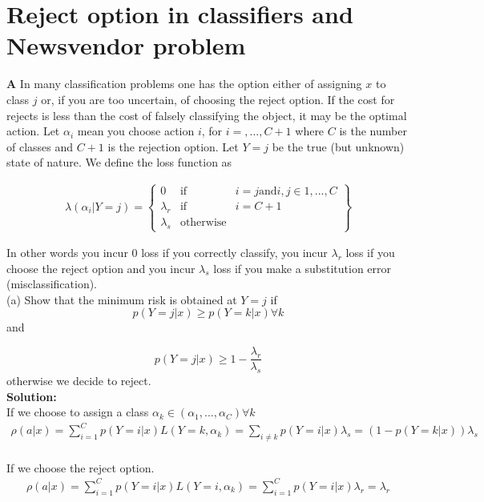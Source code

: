 \documentclass{article}
\begin{document}
\newpage
\section{Reject option in classifiers and Newsvendor problem}
\textbf{A} In many classification problems one has the option either of assigning $x$ to class $j$ or, if you are too uncertain, of choosing the reject option. If the cost for rejects is less than the cost of falsely classifying the object, it may be the optimal action. Let $\alpha_{i}$ mean you choose action $i$, for $i=,...,C+1$ where  $C$ is the number of classes and $C+1$ is the rejection option. Let $Y = j$ be the true (but unknown) state of nature. We define the loss function as 

\begin{equation}
\begin{aligned}
     \lambda(\alpha_{i}|Y=j) =  \left\{\begin{array}{rcl}
         0 & \mbox{if} & i=j \mbox{and} i,j \in {1,...,C} \\ 
         \lambda_{r}  & \mbox{if} & i=C+1 \\
         \lambda_{s}  & \mbox{otherwise}
         \end{array} \right\}
\end{aligned}
\end{equation}

In other words you incur 0 loss if you correctly classify, you incur $\lambda_{r}$ loss if you choose the reject option and you incur $\lambda_s$ loss if you make a substitution error (misclassification).
\\
(a) Show that the minimum risk is obtained at $Y=j$ if
\begin{equation}
    p(Y=j|x) \geq p(Y=k|x) \forall k
\end{equation}
and

\begin{equation}
    p(Y=j|x) \geq 1 - \frac{\lambda_r}{\lambda_s}
\end{equation}
otherwise we decide to reject.
\\
\textbf{Solution:}\\
If we choose to assign a class $\alpha_{k} \in (\alpha_1, ...,\alpha_C) \forall k$
\begin{equation}
\begin{aligned}
\rho(a|x) = \sum_{i=1}^{C}p(Y=i|x)L(Y=k,\alpha_k) = \sum_{i \neq k}p(Y=i|x)\lambda_s = (1-p(Y=k|x))\lambda_s
\end{aligned}
\end{equation}
\\
If we choose the reject option.
\begin{equation}
\begin{aligned}
\rho(a|x) = \sum_{i=1}^{C}p(Y=i|x)L(Y=i,\alpha_k) =  \sum_{i=1}^{C}p(Y=i|x)\lambda_r = \lambda_r
\end{aligned}
\end{equation}
\end{document}
